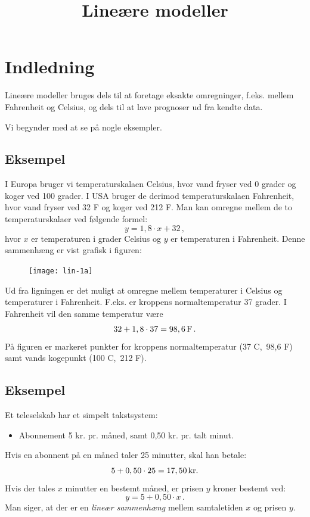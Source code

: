\documentclass[12pt,oneside,a4paper]{article}
\title{Lineære modeller}
\date{\vspace{-5ex}}
\begin{document}
\maketitle


\section{Indledning}
Lineære modeller bruges dels til at foretage eksakte omregninger, f.eks. mellem
Fahrenheit og Celsius, og dels til at lave prognoser ud fra kendte data.

Vi begynder med at se på nogle eksempler.

\subsection{Eksempel}
I Europa bruger vi temperaturskalaen Celsius, hvor vand fryser ved 0 grader og
koger ved 100 grader.  I USA bruger de derimod temperaturskalaen Fah\-renheit,
hvor vand fryser ved 32 F og koger ved 212 F.
Man kan omregne mellem de to temperaturskalaer ved følgende formel:
\[
    y = 1,8\cdot x  + 32 \,,
\]
hvor $x$ er temperaturen i grader Celsius og $y$ er temperaturen i Fahrenheit.
Denne sammenhæng er vist grafisk i figuren:

\begin{figure}[H]
    \centering
    \texttt{[image: lin-1a]}
\end{figure}

Ud fra ligningen er det muligt at omregne mellem temperaturer i Celsius og
temperaturer i Fahrenheit. F.eks.  er kroppens normaltemperatur 37 grader. I
Fahrenheit vil den samme temperatur være
\[
    32 + 1,8\cdot 37 = 98,6\, {\rm F} \,.
\]
På figuren er markeret punkter for kroppens normaltemperatur (37 C,\, 98,6 F) samt
vands kogepunkt (100 C,\, 212 F).

\subsection{Eksempel}
Et teleselskab har et simpelt takstsystem:
\begin{itemize}
    \item Abonnement 5 kr. pr. måned, samt 0,50 kr. pr. talt minut.
\end{itemize}
Hvis en abonnent på en måned taler 25 minutter, skal han betale:
$$
5 + 0,50\cdot25 = 17,50 \, {\rm kr}.
$$
Hvis der tales $x$ minutter en bestemt måned, er prisen $y$ kroner bestemt ved:
$$
y = 5 + 0,50\cdot x \,.
$$
Man siger, at der er en {\em lineær sammenhæng} mellem samtaletiden $x$ og prisen $y$.
\end{document}
